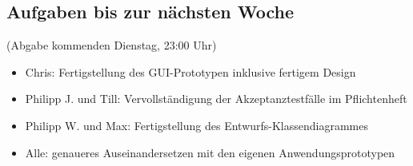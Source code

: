 \documentclass[12pt,a4paper]{article}
\begin{document}
\subsection*{Aufgaben bis zur nächsten Woche}
(Abgabe kommenden Dienstag, 23:00 Uhr)
\medskip
\begin{itemize}
\item Chris: Fertigstellung des GUI-Prototypen inklusive fertigem Design
\item Philipp J. und Till: Vervollständigung der Akzeptanztestfälle im Pflichtenheft
\item Philipp W. und Max: Fertigstellung des Entwurfs-Klassendiagrammes
\item Alle: genaueres Auseinandersetzen mit den eigenen Anwendungsprototypen
\end{itemize}
\end{document}
